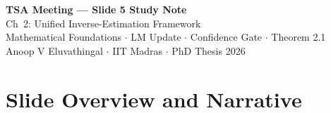 \documentclass[12pt,a4paper]{article}
\begin{document}
\begin{tcolorbox}[colback=iitmnavy,coltext=white,arc=4pt,boxrule=0pt]
\begin{center}
  {\Large\bfseries TSA Meeting --- Slide 5 Study Note}\\[4pt]
  {\large Ch~2: Unified Inverse-Estimation Framework}\\[6pt]
  {\normalsize Mathematical Foundations $\cdot$ LM Update $\cdot$ Confidence Gate $\cdot$ Theorem 2.1}\\[2pt]
  {\small Anoop V Eluvathingal $\cdot$ IIT Madras $\cdot$ PhD Thesis 2026}
\end{center}
\end{tcolorbox}

\vspace{6pt}

\section{Slide Overview and Narrative}
\end{document}

